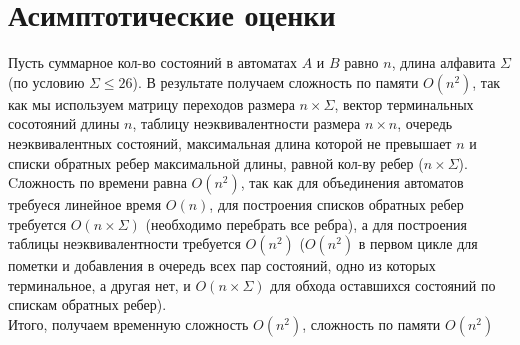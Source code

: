 \documentclass[12pt]{article}
\begin{document}
\section{Асимптотические оценки}
Пусть суммарное кол-во состояний в автоматах $A$ и $B$ равно $n$, длина алфавита $\Sigma$ (по условию $\Sigma \leq 26$). В результате получаем сложность по памяти $O(n^2)$, так как мы используем матрицу переходов размера $n\times\Sigma$, вектор терминальных сосотояний длины $n$, таблицу неэквивалентности размера $n\times n$, очередь неэквивалентных состояний, максимальная длина которой не превышает $n$ и списки обратных ребер максимальной длины, равной кол-ву ребер ($n\times\Sigma$).\\
Cложность по времени равна $O(n^2)$, так как для объединения автоматов требуеся линейное время $O(n)$, для построения списков обратных ребер требуется $O(n\times\Sigma)$ (необходимо перебрать все ребра), а для построения таблицы неэквивалентности требуется $O(n^2)$ ($O(n^2)$ в первом цикле для пометки и добавления в очередь всех пар состояний, одно из которых терминальное, а другая нет, и $O(n\times\Sigma)$ для обхода оставшихся состояний по спискам обратных ребер).\\
Итого, получаем временную сложность $O(n^2)$, сложность по памяти $O(n^2)$
\end{document}
